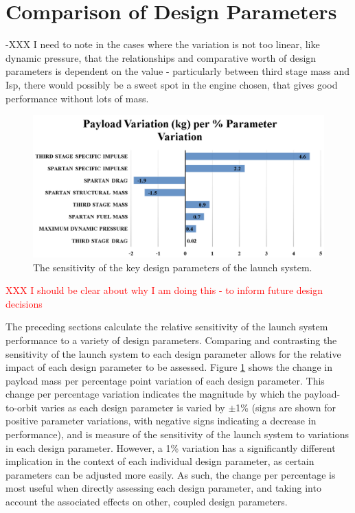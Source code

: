 \section{Comparison of Design Parameters}\label{sec:comparisonNoReturn}

-XXX I need to note in the cases where the variation is not too linear, like dynamic pressure, that the relationships and comparative worth of design parameters is dependent on the value
- particularly between third stage mass and Isp, there would possibly be a sweet spot in the engine chosen, that gives good performance without lots of mass. 

\begin{figure}[ht!]
	\centering
	\includegraphics[width=0.99\linewidth]{figures/5_Ascent/BarChartRelativePayloadChange}
	\caption{The sensitivity of the key design parameters of the launch system.}
	\label{fig:BarChartRelativePayloadChange}
\end{figure}

\textcolor{red}{XXX I should be clear about why I am doing this - to inform future design decisions}

The preceding sections calculate the relative sensitivity of the launch system performance to a variety of design parameters. 
Comparing and contrasting the sensitivity of the launch system to each design parameter allows for the relative impact of each design parameter to be assessed. 
Figure \ref{fig:BarChartRelativePayloadChange} shows the change in payload mass per percentage point variation of each design parameter. 
This change per percentage variation indicates the magnitude by which the payload-to-orbit varies as each design parameter is varied by $\pm$1\% (signs are shown for positive parameter variations, with negative signs indicating a decrease in performance), and is measure of the sensitivity of the launch system to variations in each design parameter. 
However, a 1\% variation has a significantly different implication in the context of each individual design parameter, as certain parameters can be adjusted more easily. 
As such, the change per percentage is most useful when directly assessing each design parameter, and taking into account the associated effects on other, coupled design parameters. 

